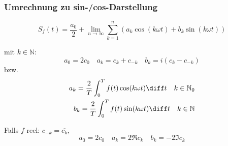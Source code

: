 \begin{sectionbox}
    \subsubsection{Umrechnung zu sin-/cos-Darstellung}
    \begin{emphbox}
        \begin{equation*}
            S_f(t)=\frac{a_0}{2}+\lim_{n\rightarrow\infty}\sum_{k=1}^{n}(a_k\cos(k\omega t) + b_k\sin(k\omega t))
        \end{equation*}
    \end{emphbox}
    mit $k\in\mathbb N$:
    \begin{equation*}
        a_0=2c_0 \quad a_k=c_k+c_{-k} \quad b_k=i(c_k-c_{-k})
    \end{equation*}
    bzw.
    \begin{align*}
        a_k=\frac{2}{T}\int_0^Tf(t)\cos(k\omega t)\diff t \quad k \in \mathbb N_0 \\
        b_k=\frac{2}{T}\int_0^Tf(t)\sin(k\omega t)\diff t \quad k \in \mathbb N
    \end{align*}

    Falls $f$ reel: $c_{-k} = \overline{c_k}$,
    \begin{equation*}
        a_0=2c_0 \quad a_k=2\Re{c_k} \quad b_k=-2\Im{c_k}
    \end{equation*}
\end{sectionbox}

